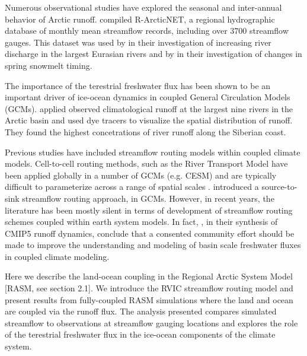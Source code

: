 \documentclass[ms, draft]{agutex}
\begin{document}
\begin{article}
Numerous observational studies have explored the seasonal and inter-annual behavior of Arctic runoff.
\citet{Lammers_2001} compiled R-ArcticNET, a regional hydrographic database of monthly mean streamflow records, including over 3700 streamflow gauges.
This dataset was used by \citet{Shiklomanov_2009} in their investigation of increasing river discharge in the largest Eurasian rivers and by \citep{Tan_2011} in their investigation of changes in spring snowmelt timing.



The importance of the terestrial freshwater flux has been shown to be an important driver of ice-ocean dynamics in coupled General Circulation Models (GCMs).
\citet{Newman_2008} applied observed climatological runoff at the largest nine rivers in the Arctic basin and used dye tracers to visualize the spatial distribution of runoff.
They found the highest concetrations of river runoff along the Siberian coast.

Previous studies have included streamflow routing models within coupled climate models.
Cell-to-cell routing methods, such as the River Transport Model \citep[RTM][]{Branstetter_2003} have been applied globally in a number of GCMs (e.g. CESM) and are typically difficult to parameterize across a range of spatial scales \citep{Sushama_2004}.
\citep{Olivera_2000} introduced a source-to-sink streamflow routing approach, in GCMs.
However, in recent years, the literature has been mostly silent in terms of development of streamflow routing schemes coupled within earth system models.
In fact, \citet{Bring_2015}, in their synthesis of CMIP5 runoff dynamics, conclude that a consented community effort should be made to improve the understanding and modeling of basin scale freshwater fluxes in coupled climate modeling.

Here we describe the land-ocean coupling in the Regional Arctic System Model [RASM, see section 2.1].
We introduce the RVIC streamflow routing model and present results from fully-coupled RASM simulations where the land and ocean are coupled via the runoff flux.
The analysis presented compares simulated streamflow to observations at streamflow gauging locations and explores the role of the terestrial freshwater flux in the ice-ocean components of the climate system.


\end{article}
\end{document}

